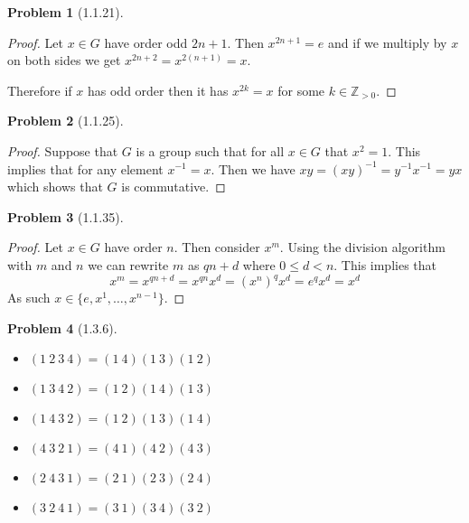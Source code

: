 \documentclass[10pt]{article}
\newcommand{\sk}{\vskip 10mm}
\newcommand{\bb}[1]{\mathbb{#1}}
\theoremstyle{plain}
\newtheorem{problem}{Problem}
\theoremstyle{remark}
\begin{document}
\begin{problem}[1.1.21] 
  
\end{problem}

\begin{proof}
  Let $x\in G$ have order odd $2n+1$. Then $x^{2n+1}=e$ and if we multiply by $x$
  on both sides we get $x^{2n+2}=x^{2(n+1)}=x$.

  Therefore if $x$ has odd order then it has $x^{2k}=x$ for some $k\in\bb{Z}_{>0}$.
\end{proof}

\sk

\begin{problem}[1.1.25] 
  
\end{problem}

\begin{proof}
  Suppose that $G$ is a group such that for all $x\in G$ that $x^2=1$.
  This implies that for any element $x^{-1}=x$. Then we have
  $xy=(xy)^{-1}=y^{-1}x^{-1}=yx$
  which shows that $G$ is commutative.
\end{proof}

\sk

\begin{problem}[1.1.35] 
  
\end{problem}

\begin{proof}
  Let $x\in G$ have order $n$. Then consider $x^m$. Using the division algorithm
  with $m$ and $n$ we can rewrite $m$ as $qn+d$ where $0\leq d<n$. This implies
  that
  \[ x^m=x^{qn+d}=x^{qn}x^d=(x^n)^qx^d=e^qx^d=x^d \]
  As such $x\in\{e,x^1,\ldots,x^{n-1}\}$.
\end{proof}

\sk

\begin{problem}[1.3.6] 
  
\end{problem}

\begin{itemize}
\item $(1\ 2\ 3\ 4)=(1\ 4)(1\ 3)(1\ 2)$
\item $(1\ 3\ 4\ 2)=(1\ 2)(1\ 4)(1\ 3)$
\item $(1\ 4\ 3\ 2)=(1\ 2)(1\ 3)(1\ 4)$
\item $(4\ 3\ 2\ 1)=(4\ 1)(4\ 2)(4\ 3)$
\item $(2\ 4\ 3\ 1)=(2\ 1)(2\ 3)(2\ 4)$
\item $(3\ 2\ 4\ 1)=(3\ 1)(3\ 4)(3\ 2)$
\end{itemize}
\end{document}
